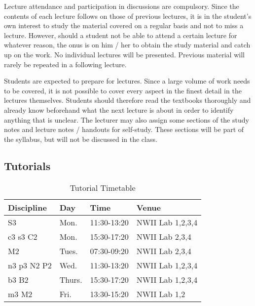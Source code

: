         Lecture attendance and participation in discussions are compulsory.
        Since the contents of each lecture follows on those of previous
        lectures, it is in the student's own interest to study the material
        covered on a regular basis and not to miss a lecture. However, should a
        student not be able to attend a certain lecture for whatever reason,
        the onus is on him / her to obtain the study material and catch up on
        the work. No individual lectures will be presented. Previous material
        will rarely be repeated in a following lecture.

        Students are expected to prepare for lectures. Since a large volume of
        work needs to be covered, it is not possible to cover every aspect in
        the finest detail in the lectures themselves. Students should therefore
        read the textbooks thoroughly and already know beforehand what the next
        lecture is about in order to identify anything that is unclear. The
        lecturer may also assign some sections of the study notes and lecture
        notes / handouts for self-study. These sections will be part of the
        syllabus, but will not be discussed in the class.

    \subsection{Tutorials}
        \begin{table}[!h]
            \begin{center}
            \begin{tabular}{|l|l|l|l|}
                \hline
                {\bf Discipline} & {\bf Day} & {\bf Time} & {\bf Venue} \\
                \hline
                S3          & Mon.   & 11:30-13:20 & NWII Lab 1,2,3,4 \\
                c3 s3 C2    & Mon.   & 15:30-17:20 & NWII Lab 2,3,4 \\
                M2          & Tues.  & 07:30-09:20 & NWII Lab 2,3,4 \\
                n3 p3 N2 P2 & Wed.   & 11:30-13:20 & NWII Lab 1,2,3,4 \\
                b3 B2       & Thurs. & 15:30-17:20 & NWII Lab 1,2,3,4 \\
                m3 M2       & Fri.   & 13:30-15:20 & NWII Lab 1,2 \\
                \hline
            \end{tabular}
            \caption{Tutorial Timetable}
            \label{tab:tutorials}
            \end{center}
        \end{table}

